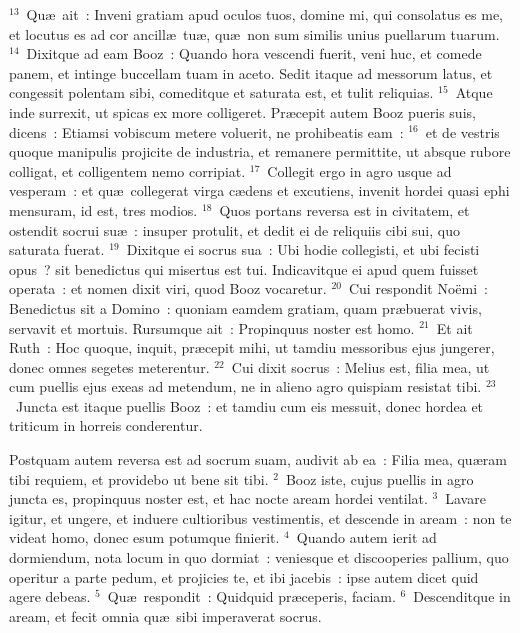 ${}^{13}$~Qu\ae\ ait~: Inveni gratiam apud oculos tuos, domine mi, qui consolatus es me, et locutus es ad cor ancill\ae\ tu\ae , qu\ae\ non sum similis unius puellarum tuarum.
${}^{14}$~Dixitque ad eam Booz~: Quando hora vescendi fuerit, veni huc, et comede panem, et intinge buccellam tuam in aceto. Sedit itaque ad messorum latus, et congessit polentam sibi, comeditque et saturata est, et tulit reliquias.
${}^{15}$~Atque inde surrexit, ut spicas ex more colligeret. Pr\ae cepit autem Booz pueris suis, dicens~: Etiamsi vobiscum metere voluerit, ne prohibeatis eam~:
${}^{16}$~et de vestris quoque manipulis projicite de industria, et remanere permittite, ut absque rubore colligat, et colligentem nemo corripiat.
${}^{17}$~Collegit ergo in agro usque ad vesperam~: et qu\ae\ collegerat virga c\ae dens et excutiens, invenit hordei quasi ephi mensuram, id est, tres modios.
${}^{18}$~Quos portans reversa est in civitatem, et ostendit socrui su\ae~: insuper protulit, et dedit ei de reliquiis cibi sui, quo saturata fuerat.
${}^{19}$~Dixitque ei socrus sua~: Ubi hodie collegisti, et ubi fecisti opus~? sit benedictus qui misertus est tui. Indicavitque ei apud quem fuisset operata~: et nomen dixit viri, quod Booz vocaretur.
${}^{20}$~Cui respondit No\"emi~: Benedictus sit a Domino~: quoniam eamdem gratiam, quam pr\ae buerat vivis, servavit et mortuis. Rursumque ait~: Propinquus noster est homo.
${}^{21}$~Et ait Ruth~: Hoc quoque, inquit, pr\ae cepit mihi, ut tamdiu messoribus ejus jungerer, donec omnes segetes meterentur.
${}^{22}$~Cui dixit socrus~: Melius est, filia mea, ut cum puellis ejus exeas ad metendum, ne in alieno agro quispiam resistat tibi.
${}^{23}$~Juncta est itaque puellis Booz~: et tamdiu cum eis messuit, donec hordea et triticum in horreis conderentur.

\lettrine[lines=3,image=true,loversize=0.05,lraise=-0.03]{P}{}ostquam autem reversa est ad socrum suam, audivit ab ea~: Filia mea, qu\ae ram tibi requiem, et providebo ut bene sit tibi.
${}^{2}$~Booz iste, cujus puellis in agro juncta es, propinquus noster est, et hac nocte aream hordei ventilat.
${}^{3}$~Lavare igitur, et ungere, et induere cultioribus vestimentis, et descende in aream~: non te videat homo, donec esum potumque finierit.
${}^{4}$~Quando autem ierit ad dormiendum, nota locum in quo dormiat~: veniesque et discooperies pallium, quo operitur a parte pedum, et projicies te, et ibi jacebis~: ipse autem dicet quid agere debeas.
${}^{5}$~Qu\ae\ respondit~: Quidquid pr\ae ceperis, faciam.
${}^{6}$~Descenditque in aream, et fecit omnia qu\ae\ sibi imperaverat socrus.


